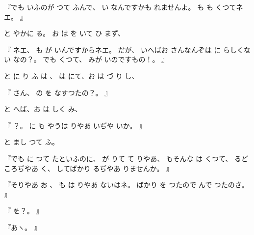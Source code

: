 『でも
いふのが
つて
ふんで、
い
なんですかも
れませんよ。
も
も
くつてネエ。
』

と
やかに
る。
お
は
を
いて
ひ
まず、

『
ネエ、
も
が
いんですからネエ。
だが、
いへばお
さんなんぞは
に
らしくない
なの？。
でも
くつて、
みが
いのですもの！。
』

と
に
り
ふ
は
、
は
にて、お
は
づ
り
し、

『
さん、
の
を
なすつたの？。
』

と
へば、お
は
しく
み、

『
？。
に
も
やうは
りやあ
いぢや
いか。
』

と
まし
つて
ふ。

『でも
に
つて
たといふのに、
が
りて
て
りやあ、
もそんな
は
くつて、
るどころぢやあ
く、
してばかり
るぢやあ
りませんか。
』

『そりやあ
お
、
も
は
りやあ
ないはネ。
ばかり
を
つたので
んで
つたのさ。
』

『
を？。
』

『あヽ。
』

